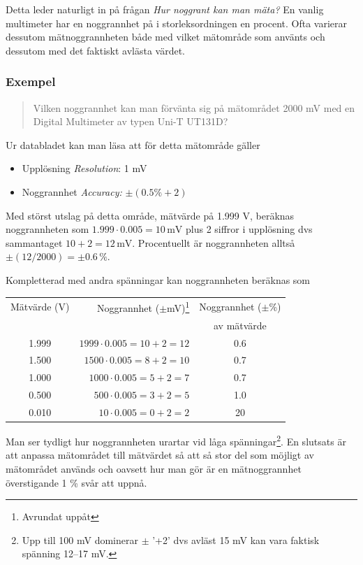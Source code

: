 \documentclass[oneside,11pt,a4paper,swedish]{scrbook}
\newcommand{\startex}[1]{\subsubsection{Exempel}\begin{quote}#1\end{quote}}
\begin{document}
Detta leder naturligt in på frågan \emph{Hur noggrant kan man mäta?} 
En vanlig multimeter har en noggrannhet på i storleksordningen en procent. Ofta varierar dessutom mätnoggrannheten både med vilket mätområde som använts och dessutom med det faktiskt avlästa värdet. 

\startex{Vilken noggrannhet kan man förvänta sig på mätområdet 2000 mV med en Digital Multimeter av typen Uni-T UT131D?}

Ur databladet kan man läsa att för detta mätområde gäller 
\begin{itemize}
\item Upplösning \emph{Resolution}: 1 mV
\item Noggrannhet \emph{Accuracy:} $\pm(0.5 \% + 2)$
\end{itemize}

Med störst utslag på detta område, mätvärde på 1.999 V, beräknas noggrannheten som $1.999 \cdot 0.005= 10\,\textrm{mV}$ plus 2 siffror i upplösning dvs sammantaget $10+2=12\,\textrm{mV}$. Procentuellt är noggrannheten alltså $\pm (12/2000)= \pm 0.6\,\%$.

Kompletterad med andra spänningar kan noggrannheten beräknas som 

\begin{center}
\begin{tabular}{c|r|c}

Mätvärde (V) & Noggrannhet ($\pm$mV)\footnote{Avrundat uppåt} & Noggrannhet ($\pm$\%) \\
&  & av mätvärde\\
\hline
 1.999  & $1999 \cdot 0.005= 10 +2=12$  & 0.6\\
 1.500 & $1500 \cdot 0.005= 8 +2=10$ & 0.7\\
 1.000 & $1000 \cdot 0.005= 5 +2=7$ & 0.7\\
 0.500 & $ 500 \cdot 0.005= 3 +2=5$ & 1.0\\
 0.010 & $  10 \cdot 0.005= 0 +2=2$ & 20\\
\end{tabular}
\end{center}

Man ser tydligt hur noggrannheten urartar vid låga spänningar\footnote{Upp till 100 mV dominerar $\pm$ '+2' dvs  avläst 15 mV kan vara faktisk spänning 12--17 mV.}. En slutsats är att anpassa mätområdet till mätvärdet så att så stor del som möjligt av mätområdet används och oavsett hur man gör är en mätnoggrannhet överstigande 1 \% svår att uppnå.

\end{document}
